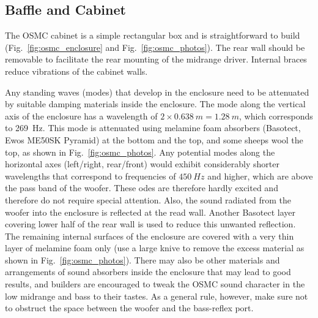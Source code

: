 \documentclass[12pt,a4paper]{article}
\providecommand{\figr}[1]{Fig.~\ref{fig:#1}}
\begin{document}
\subsection{Baffle and Cabinet}
The OSMC cabinet is a simple rectangular box and is straightforward to build (\figr{osmc_enclosure} and \figr{osmc_photos}). The rear wall should be removable to facilitate the rear mounting of the midrange driver. Internal braces reduce vibrations of the cabinet walls.\par

Any standing waves (modes) that develop in the enclosure need to be attenuated by suitable damping materials inside the enclosure. The mode along the vertical axis of the enclosure has a wavelength of $2 \times \SI{0.638}{m} = \SI{1.28}{m}$, which corresponds to \SI{269}{Hz}. This mode is attenuated using melamine foam absorbers (Basotect, Ewos ME50SK Pyramid) at the bottom and the top, and some sheeps wool the top, as shown in \figr{osmc_photos}. Any potential modes along the horizontal axes (left/right, rear/front) would exhibit considerably shorter wavelengths that correspond to frequencies of $\SI{450}{Hz}$ and higher, which are above the pass band of the woofer. These odes are therefore hardly excited and therefore do not require special attention. Also, the sound radiated from the woofer into the enclosure is reflected at the read wall. Another Basotect layer covering lower half of the rear wall is used to reduce this unwanted reflection. The remaining internal surfaces of the enclosure are covered with a very thin layer of melamine foam only (use a large knive to remove the excess material as shown in \figr{osmc_photos}). There may also be other materials and arrangements of sound absorbers inside the enclosure that may lead to good results, and builders are encouraged to tweak the OSMC sound character in the low midrange and bass to their tastes. As a general rule, however, make sure not to obstruct the space between the woofer and the bass-reflex port.
\end{document}
